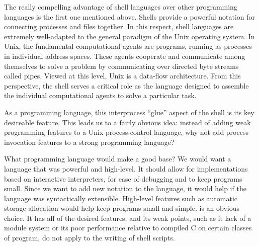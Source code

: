 The really compelling advantage of shell languages over other programming
languages is the first one mentioned above. Shells provide a powerful
notation for connecting processes and files together. In this respect,
shell languages are extremely well-adapted to the general paradigm of
the Unix operating system.
In Unix, the fundamental computational agents are programs, running
as processes in individual address spaces.
These agents cooperate and communicate among themselves to solve a problem
by communicating over directed byte streams called pipes.
Viewed at this level, Unix is a data-flow architecture.
From this perspective, the shell serves a critical role
as the language designed to assemble the individual computational
agents to solve a particular task.

As a programming language, this interprocess ``glue'' aspect of the
shell is its key desireable feature.
This leads us to a fairly obvious idea: instead of adding weak
programming features to a Unix process-control language, 
why not add process invocation features to a strong programming language?

What programming language would make a good base?
We would want a language that was powerful and high-level.
It should allow for implementations based on interactive interpreters, for
ease of debugging and to keep programs small.
Since we want to add new notation to the language, it would help if the
language was syntactically extensible.
High-level features such as automatic storage allocation would help keep
programs small and simple.
{\Scheme} is an obvious choice.
It has all of the desired features, and its weak points, such as it lack of a
module system or its poor performance relative to compiled C on certain
classes of program, do not apply to the writing of shell scripts.

